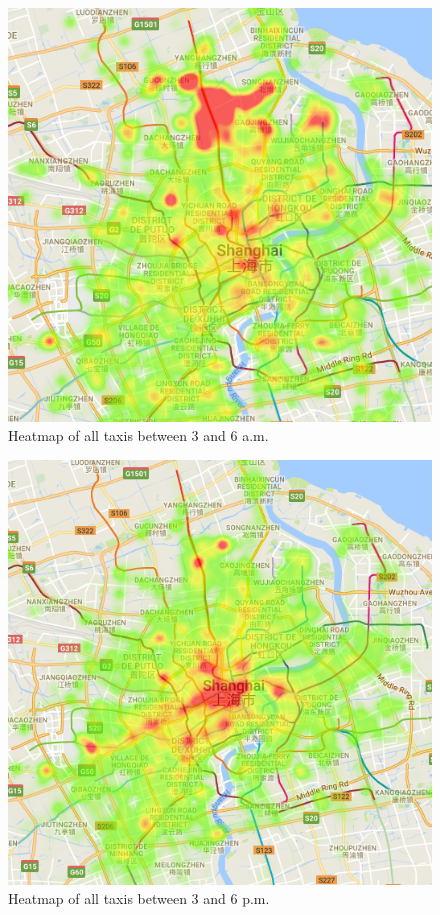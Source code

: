\documentclass[11pt,conference,a4paper,twocolumns,romanappendices]{IEEEtran}
\begin{document}
\begin{figure}[h]
\centering
\includegraphics[scale=0.45]{3to6.png}
\caption{\label{fig:h3to6}Heatmap of all taxis between 3 and 6 a.m.}
\end{figure}

\begin{figure}[h]
\centering
\includegraphics[scale=0.45]{15to18.png}
\caption{\label{fig:h15to18}Heatmap of all taxis between 3 and 6 p.m.}
\end{figure}
\end{document}
